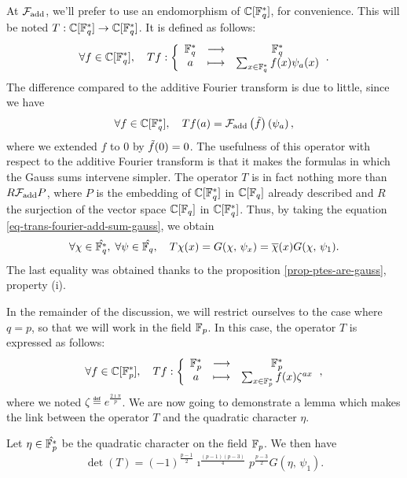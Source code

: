  
At $ \mathcal{F}_{\text{add}} $, we'll prefer to use an endomorphism of $ \mathbb{C} [\mathbb{F}_q^*] $, for convenience. This will be noted $ T: \mathbb{C} [\mathbb{F}_q^*] \rightarrow \mathbb{C} [\mathbb{F}_q^*] $. It is defined as follows:
\begin{equation*}
\forall f \in \mathbb{C} [\mathbb{F}_q^*], \quad T f: {\left\{ \begin{array}{ccc} \mathbb{F}_q^* & \longrightarrow & \mathbb{F}_q^* \\ a & \longmapsto & \sum_{x \in \mathbb{F}_q^*}^{}f(x) \psi_a (x) \end{array} \right.}.
\end{equation*}
The difference compared to the additive Fourier transform is due to little, since we have
\begin{equation*}
\forall f \in \mathbb{C} [\mathbb{F}_q^*], \quad T f(a) = \mathcal{F}_{\text{add}} \left(\tilde{f} \right) \left(\psi_a \right) ,
\end{equation*}
where we extended $ f $ to 0 by $ \tilde{f} (0) = 0 $. The usefulness of this operator with respect to the additive Fourier transform is that it makes the formulas in which the Gauss sums intervene simpler. The operator $ T $ is in fact nothing more than $ R \mathcal{F}_{\text{add}} P $, where $ P $ is the embedding of $ \mathbb{C} [\mathbb{F}_q^*] $ in $ \mathbb{C} [\mathbb{F}_q] $ already described and $ R $ the surjection of the vector space $ \mathbb{C} [\mathbb{F}_q] $ in $ \mathbb{C} [\mathbb{F}_q^*] $. Thus, by taking the equation \eqref{eq-trans-fourier-add-sum-gauss}, we obtain
\begin{equation}
\label{eq-expression-operator-t-char-mult}
\forall \chi \in \hat{\mathbb{F}_q^*}, \; \forall \psi \in \hat{\mathbb{F}_q}, \quad T \chi (x) = G (\chi, \, \psi_x) = \overline{\chi} (x) G (\chi, \, \psi_1).
\end{equation}
The last equality was obtained thanks to the proposition \ref{prop-ptes-are-gauss}, property (i).
 
In the remainder of the discussion, we will restrict ourselves to the case where
$ q = p $, so that we will work in the field $ \mathbb{F}_p $. In this case, the operator $ T $ is expressed as follows:
\begin{equation*}
\forall f \in \mathbb{C} [\mathbb{F}_p^*], \quad T f: {\left\{ \begin{array}{ccc} \mathbb{F}_p^* & \longrightarrow & \mathbb{F}_p^* \\ a & \longmapsto & \sum_{x \in \mathbb{F}_p^*}^{}f(x) \zeta^{ax} \end{array} \right.},
\end{equation*}
where we noted $ \zeta \eqdef e^{\frac{2 \imath \pi}{p}} $. We are now going to demonstrate a lemma which makes the link between the operator $ T $ and the quadratic character $ \eta $.
 
\begin{lem}
\label{lem-calcul-det-T}
Let $ \eta \in \hat{\mathbb{F}_p^*} $ be the quadratic character on the field $ \mathbb{F}_p $. We then have
\begin{equation*}
\det (T) = (-1)^{\frac{p-1}{2}} \imath^{\frac{(p-1) (p-3)}{4}} p^{\frac{p-3}{2}} G (\eta, \, \psi_1).
\end{equation*}
\end{lem}
 
